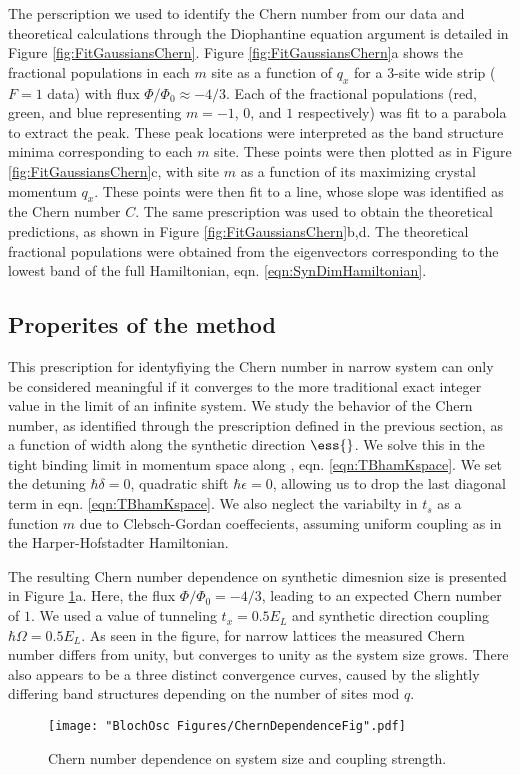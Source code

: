 The perscription we used to identify the Chern number from our data and theoretical calculations through the Diophantine equation argument is detailed in Figure \ref{fig:FitGaussiansChern}. Figure \ref{fig:FitGaussiansChern}a shows the fractional populations in each $m$ site as a function of $q_x$ for a $3$-site wide strip ($F=1$ data) with flux $\Phi/\Phi_0\approx-4/3$. Each of the fractional populations (red, green, and blue representing $m=-1$, $0$, and $1$ respectively) was fit to a parabola to extract the peak. These peak locations were interpreted as the band structure minima corresponding to each $m$ site. These points were then plotted as in Figure \ref{fig:FitGaussiansChern}c, with site $m$ as a function of its maximizing crystal momentum $q_x$. These points were then fit to a line, whose slope was identified as the Chern number $C$. The same prescription was used to obtain the theoretical predictions, as shown in Figure \ref{fig:FitGaussiansChern}b,d. The theoretical fractional populations were obtained from the eigenvectors corresponding to the lowest band of the full Hamiltonian, eqn. \ref{eqn:SynDimHamiltonian}. 

\subsection{Properites of the method}

This prescription for identyfiying the Chern number in narrow system can only be considered meaningful if it converges to the more traditional exact integer value in the limit of an infinite system. We study the behavior of the Chern number, as identified through the prescription defined in the previous section, as a function of width along the synthetic direction $\ess{}$. We solve this in the tight binding limit in momentum space along \ex{}, eqn. \ref{eqn:TBhamKspace}. We set the detuning $\hbar\delta=0$, quadratic shift $\hbar\epsilon=0$, allowing us to drop the last diagonal term in eqn. \ref{eqn:TBhamKspace}. We also neglect the variabilty in $t_s$ as a function $m$ due to Clebsch-Gordan coeffecients, assuming uniform coupling as in the Harper-Hofstadter Hamiltonian.

The resulting Chern number dependence on synthetic dimesnion size is presented in Figure \ref{fig:ChernDependenceFig}a. Here, the flux $\Phi/\Phi_0 = - 4/3$, leading to an expected Chern number of $1$. We used a value of tunneling $t_x = 0.5 E_L$ and synthetic direction coupling $\hbar\Omega = 0.5 E_L$. As seen in the figure, for narrow lattices the measured Chern number differs from unity, but converges to unity as the system size grows. There also appears to be a three distinct convergence curves, caused by the slightly differing band structures depending on the number of sites mod $q$. 
\begin{figure}
\texttt{[image: "BlochOsc Figures/ChernDependenceFig".pdf]}
\caption[Chern number dependence] {Chern number dependence on system size and coupling strength.}
\label{fig:ChernDependenceFig}
\end{figure}

